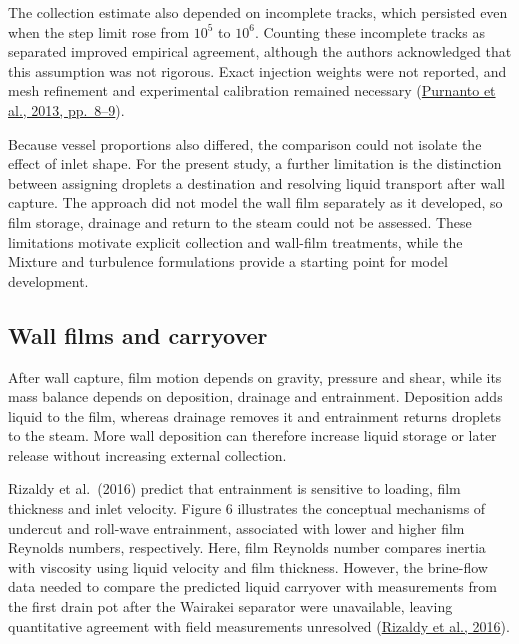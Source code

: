 \documentclass[12pt]{article}
\begin{document}
The collection estimate also depended on incomplete tracks, which persisted even when the step limit rose from \(10^5\) to \(10^6\). Counting these incomplete tracks as separated improved empirical agreement, although the authors acknowledged that this assumption was not rigorous. Exact injection weights were not reported, and mesh refinement and experimental calibration remained necessary (\href{https://www.researchgate.net/publication/269519626_CFD_MODELLING_OF_TWO-PHASE_FLOW_INSIDE_GEOTHERMAL_STEAM-WATER_SEPARATORS}{Purnanto et al., 2013, pp.~8--9}).

Because vessel proportions also differed, the comparison could not isolate the effect of inlet shape. For the present study, a further limitation is the distinction between assigning droplets a destination and resolving liquid transport after wall capture. The approach did not model the wall film separately as it developed, so film storage, drainage and return to the steam could not be assessed. These limitations motivate explicit collection and wall-film treatments, while the Mixture and turbulence formulations provide a starting point for model development.

\subsection{Wall films and carryover}\label{wall-films-and-carryover}

After wall capture, film motion depends on gravity, pressure and shear, while its mass balance depends on deposition, drainage and entrainment. Deposition adds liquid to the film, whereas drainage removes it and entrainment returns droplets to the steam. More wall deposition can therefore increase liquid storage or later release without increasing external collection.

Rizaldy et al.~(2016) predict that entrainment is sensitive to loading, film thickness and inlet velocity. Figure 6 illustrates the conceptual mechanisms of undercut and roll-wave entrainment, associated with lower and higher film Reynolds numbers, respectively. Here, film Reynolds number compares inertia with viscosity using liquid velocity and film thickness. However, the brine-flow data needed to compare the predicted liquid carryover with measurements from the first drain pot after the Wairakei separator were unavailable, leaving quantitative agreement with field measurements unresolved (\href{https://www.researchgate.net/publication/310818568_LIQUID_CARRYOVER_IN_GEOTHERMAL_STEAM-WATER_SEPARATORS}{Rizaldy et al., 2016}).
\end{document}
